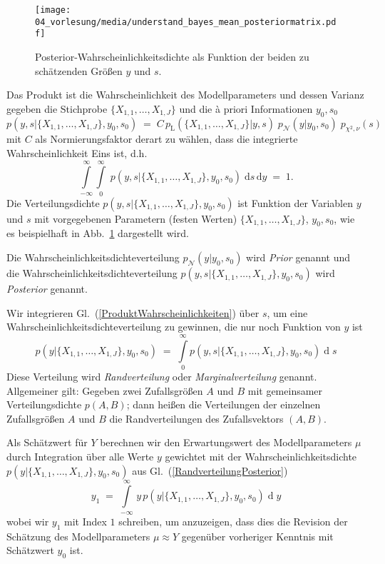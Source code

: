 \begin{figure}
\begin{center}
\texttt{[image: 04\_vorlesung/media/understand\_bayes\_mean\_posteriormatrix.pdf]}
\caption{\label{posteriormatrix} Posterior-Wahrscheinlichkeitsdichte als Funktion
der beiden zu schätzenden Größen $y$ und $s$.}
\end{center}
\end{figure}
Das Produkt ist die Wahrscheinlichkeit des Modellparameters und dessen Varianz gegeben
die Stichprobe $\{X_{1,1}, \dots, X_{1,J}\}$ und die {\`a} priori Informationen $y_0, s_0$
\begin{equation}
p(y, s | \{X_{1,1}, \dots, X_{1,J}\}, y_0, s_0) \; = \; C \,
p_\mathrm{L}(\{X_{1,1}, \dots, X_{1,J}\} | y, s) \; p_\mathcal{N}(y | y_0, s_0) \; p_{\chi^2,\nu}(s)
\label{ProduktWahrscheinlichkeiten}
\end{equation}
mit $C$ als Normierungsfaktor derart zu wählen, dass die integrierte Wahrscheinlichkeit Eins ist, d.h.
$$
\int\limits_{-\infty}^\infty  \int\limits_0^\infty \; p(y, s | \{X_{1,1}, \dots, X_{1,J}\}, y_0, s_0) \;
\mathrm{d}s \, \mathrm{d}y \; = \; 1 .
$$
Die Verteilungsdichte $p(y, s | \{X_{1,1}, \dots, X_{1,J}\}, y_0, s_0)$ ist Funktion der
Variablen $y$ und $s$ mit vorgegebenen Parametern
(festen Werten) $\{X_{1,1}, \dots, X_{1,J}\}$, $y_0, s_0$, wie es beispielhaft in
Abb.~\ref{posteriormatrix} dargestellt wird.

Die Wahrscheinlichkeitsdichteverteilung
$p_\mathcal{N}(y | y_0, s_0)$ wird \textsl{Prior} genannt und die
Wahr\-schein\-lich\-keits\-dichte\-ver\-teilung $p(y, s | \{X_{1,1}, \dots, X_{1,J}\}, y_0, s_0)$
wird \textsl{Posterior} genannt.

Wir integrieren Gl.~(\ref{ProduktWahrscheinlichkeiten}) über $s$, um eine
Wahrscheinlichkeits\-dichte\-verteilung zu gewinnen, die nur noch Funktion von $y$ ist
\begin{equation}
p(y | \{X_{1,1}, \dots, X_{1,J}\}, y_0, s_0)  \; = \;
\int\limits_0^\infty p(y, s | \{X_{1,1}, \dots, X_{1,J}\}, y_0, s_0) \operatorname{d}s
\label{RandverteilungPosterior}
\end{equation}
Diese Verteilung wird \textsl{Randverteilung} oder \textsl{Marginalverteilung} genannt.
Allgemeiner gilt: Gegeben zwei Zufallsgrößen $A$ und $B$ mit gemeinsamer Verteilungsdichte
$p(A, B)$; dann heißen die Verteilungen der einzelnen Zufallsgrößen
$A$ und $B$ die Randverteilungen des Zufallsvektors $(A, B)$.

Als Schätzwert für $Y$ berechnen wir den Erwartungswert des Modellparameters $\mu$
durch Integration über alle Werte $y$ gewichtet mit der Wahrscheinlichkeitsdichte\\
$p(y | \{X_{1,1}, \dots, X_{1,J}\}, y_0, s_0)$ aus Gl.~(\ref{RandverteilungPosterior})
\begin{equation}
y_1 \; = \; \int\limits_{-\infty}^\infty \, y \, p(y | \{X_{1,1}, \dots, X_{1,J}\}, y_0, s_0)
\operatorname{d}y
\end{equation}
wobei wir $y_1$ mit Index $1$ schreiben, um anzuzeigen, dass dies die Revision der Schätzung des
Modellparameters $\mu \approx Y$ gegenüber vorheriger Kenntnis mit Schätzwert $y_0$ ist.

